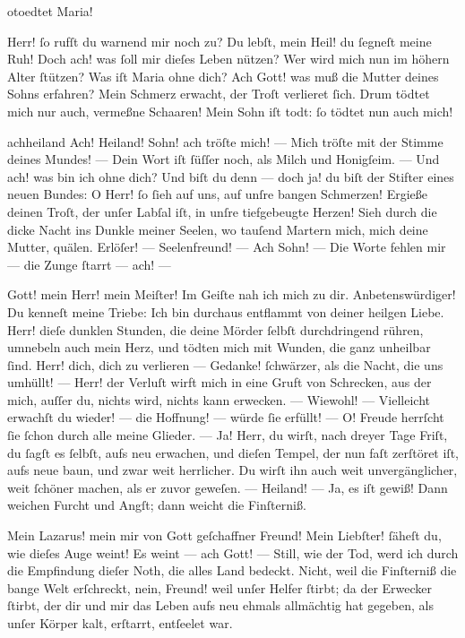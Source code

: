 \documentclass{ees}
\begin{document}
{\begin{movement}{otoedtet}
    \voice[Jeſus]
    Maria!

    \voice[Maria]
    Herr! ſo rufſt du warnend mir noch zu?
    Du lebſt, mein Heil! du ſegneſt meine Ruh!
    Doch ach! was ſoll mir dieſes Leben nützen?
    Wer wird mich nun im höhern Alter ſtützen?
    Was iſt Maria ohne dich?
    Ach Gott! was muß die Mutter deines Sohns erfahren?
    Mein Schmerz erwacht, der Troſt verlieret ſich.
    Drum tödtet mich nur auch, vermeßne Schaaren!
    Mein Sohn iſt todt: ſo tödtet nun auch mich!
  \end{movement}

  \begin{movement}{achheiland}
    \voice[Maria]
    Ach! Heiland! Sohn! ach tröſte mich! —
    Mich tröſte mit der Stimme deines Mundes! —
    Dein Wort iſt ſüſſer noch, als Milch und Honigſeim. —
    Und ach! was bin ich ohne dich?
    Und biſt du denn — doch ja! du biſt
    der Stifter eines neuen Bundes:
    O Herr! ſo ſieh auf uns, auf unſre bangen Schmerzen!
    Ergieße deinen Troſt, der unſer Labſal iſt,
    in unſre tiefgebeugte Herzen!
    Sieh durch die dicke Nacht ins Dunkle meiner Seelen,
    wo tauſend Martern mich, mich deine Mutter, quälen.
    Erlöſer! — Seelenfreund! — Ach Sohn! — Die Worte fehlen mir —
    die Zunge ſtarrt — ach! —

    \voice[Johannes]
    \hspace*{3cm}Gott! mein Herr! mein Meiſter!
    Im Geiſte nah ich mich zu dir.
    Anbetenswürdiger! Du kenneſt meine Triebe:
    Ich bin durchaus entflammt von deiner heilgen Liebe.
    Herr! dieſe dunklen Stunden,
    die deine Mörder ſelbſt durchdringend rühren,
    umnebeln auch mein Herz, und tödten mich mit Wunden,
    die ganz unheilbar ſind. Herr! dich, dich zu verlieren —
    Gedanke! ſchwärzer, als die Nacht, die uns umhüllt! —
    Herr! der Verluſt wirft mich in eine Gruft von Schrecken,
    aus der mich, auſſer du, nichts wird, nichts kann erwecken. —
    Wiewohl! — Vielleicht erwachſt du wieder! —
    die Hoffnung! — würde ſie erfüllt! —
    O! Freude herrſcht ſie ſchon durch alle meine Glieder. —
    Ja! Herr, du wirſt, nach dreyer Tage Friſt,
    du ſagſt es ſelbſt, aufs neu erwachen,
    und dieſen Tempel, der nun faſt zerſtöret iſt,
    aufs neue baun, und zwar weit herrlicher.
    Du wirſt ihn auch weit unvergänglicher,
    weit ſchöner machen,
    als er zuvor geweſen. — Heiland! — Ja, es iſt gewiß!
    Dann weichen Furcht und Angſt; dann weicht die Finſterniß.

    \voice[Eidli]
    Mein Lazarus! mein mir von Gott geſchaffner Freund!
    Mein Liebſter! ſäheſt du, wie dieſes Auge weint!
    Es weint — ach Gott! — Still, wie der Tod,
    werd ich durch die Empfindung dieſer Noth,
    die alles Land bedeckt.
    Nicht, weil die Finſterniß die bange Welt erſchreckt,
    nein, Freund! weil unſer Helfer ſtirbt;
    da der Erwecker ſtirbt, der dir und mir das Leben
    aufs neu ehmals allmächtig hat gegeben,
    als unſer Körper kalt, erſtarrt, entſeelet war.


\end{movement}}
\end{document}
